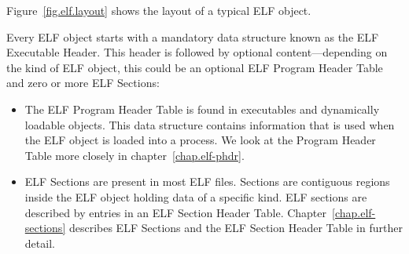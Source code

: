 \documentclass[a4paper,pdftex]{book}
\newcommand{\elfdatastructure}[1]{\textsf{#1}}
\begin{document}
Figure~\vref{fig.elf.layout} shows the layout of a typical ELF
object.

Every ELF object starts with a mandatory data structure known as the
ELF \elfdatastructure{Executable Header}.
This header is followed by optional content---depending on the kind of
ELF object, this could be an optional ELF \elfdatastructure{Program
  Header Table} and zero or more ELF
\elfdatastructure{Sections}:

\begin{itemize}
\item The ELF \elfdatastructure{Program Header
  Table} is found in executables and
  dynamically loadable objects.  This data structure contains
  information that is used when the ELF object is loaded into a
  process.  We look at the \elfdatastructure{Program
    Header Table} more closely in chapter~\vref{chap.elf-phdr}.
\item ELF \elfdatastructure{Sections} are present in
  most ELF files. Sections are contiguous regions inside the ELF
  object holding data of a specific kind. ELF sections are described
  by entries in an ELF \elfdatastructure{Section Header
    Table}.
  Chapter~\vref{chap.elf-sections} describes ELF
  \elfdatastructure{Sections} and the ELF \elfdatastructure{Section
    Header Table} in further detail.
\end{itemize}
\end{document}
